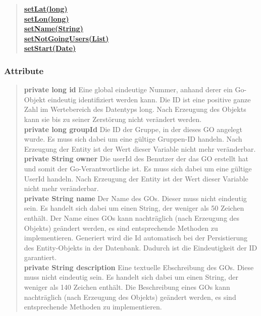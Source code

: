 \documentclass[11pt,a4paper]{article}
\begin{document}
{{{{\begin{verse}
\hyperlink{edu.kit.pse17.go_app.PersistenceLayer.GoEntity.setLat(long)}{{\bf setLat(long)}} \\
\hyperlink{edu.kit.pse17.go_app.PersistenceLayer.GoEntity.setLon(long)}{{\bf setLon(long)}} \\
\hyperlink{edu.kit.pse17.go_app.PersistenceLayer.GoEntity.setName(java.lang.String)}{{\bf setName(String)}} \\
\hyperlink{edu.kit.pse17.go_app.PersistenceLayer.GoEntity.setNotGoingUsers(java.util.List)}{{\bf setNotGoingUsers(List)}} \\
\hyperlink{edu.kit.pse17.go_app.PersistenceLayer.GoEntity.setStart(java.util.Date)}{{\bf setStart(Date)}} \\
\end{verse}
}
\subsubsection{Attribute}{
\begin{verse}
{{\bf private long id}} Eine global eindeutige Nummer, anhand derer ein Go-Objekt eindeutig identifiziert werden kann. Die ID ist eine positive ganze Zahl im Wertebereich des Datentyps long. Nach Erzeugung des Objekts kann sie bis zu seiner Zerstörung nicht verändert werden.\\[0.5em]

{{\bf private long groupId}} Die ID der Gruppe, in der dieses GO angelegt wurde. Es muss sich dabei um eine gültige Gruppen-ID handeln. Nach Erzeugung der Entity ist der Wert dieser Variable nicht mehr veränderbar.\\[0.5em]

{{\bf private String owner}} Die userId des Benutzer der das GO erstellt hat und somit der Go-Verantwortliche ist. Es muss sich dabei um eine gültige UserId handeln. Nach Erzeugung der Entity ist der Wert dieser Variable nicht mehr veränderbar.\\[0.5em]

{{\bf private String name}} Der Name des GOs. Dieser muss nicht eindeutig sein. Es handelt sich dabei um einen String, der weniger als 50 Zeichen enthält. Der Name eines GOs kann nachträglich (nach Erzeugung des Objekts) geändert werden, es sind entsprechende Methoden zu implementieren. Generiert wird die Id automatisch bei der Persistierung des Entity-Objekts in der Datenbank. Dadurch ist die Eindeutigkeit der ID garantiert.\\[0.5em]

{{\bf private String description}} Eine textuelle Ebschreibung des GOs. Diese muss nicht eindeutig sein.
     Es handelt sich dabei um einen String, der weniger als 140 Zeichen enthält.
     Die Beschreibung eines GOs kann nachträglich (nach Erzeugung des Objekts) geändert werden, es sind entsprechende Methoden zu implementieren.\\[0.5em]
     

\end{verse}}}}}
\end{document}
